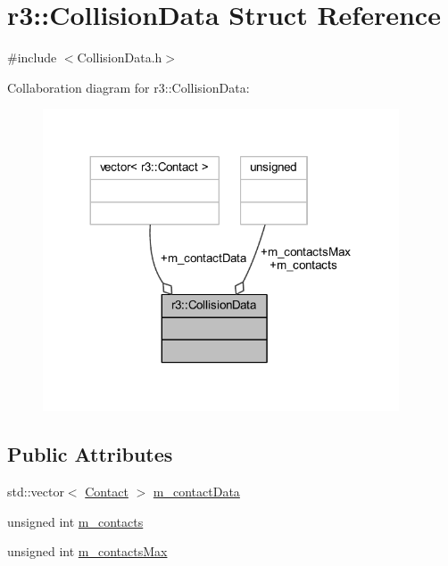 \hypertarget{structr3_1_1_collision_data}{}\section{r3\+:\+:Collision\+Data Struct Reference}
\label{structr3_1_1_collision_data}


{\ttfamily \#include $<$Collision\+Data.\+h$>$}



Collaboration diagram for r3\+:\+:Collision\+Data\+:\nopagebreak
\begin{figure}[H]
\begin{center}
\leavevmode
\includegraphics[width=299pt]{structr3_1_1_collision_data__coll__graph}
\end{center}
\end{figure}
\subsection*{Public Attributes}
\begin{DoxyCompactItemize}
\item 
std\+::vector$<$ \mbox{\hyperlink{classr3_1_1_contact}{Contact}} $>$ \mbox{\hyperlink{structr3_1_1_collision_data_a39dcfed493cd263aeb4a7c250a439d19}{m\+\_\+contact\+Data}}
\item 
unsigned int \mbox{\hyperlink{structr3_1_1_collision_data_a79384b55832be3c4ec4827a727e99963}{m\+\_\+contacts}}
\item 
unsigned int \mbox{\hyperlink{structr3_1_1_collision_data_a6ca37bba9db5d95027b486b17f51bde3}{m\+\_\+contacts\+Max}}
\end{DoxyCompactItemize}


